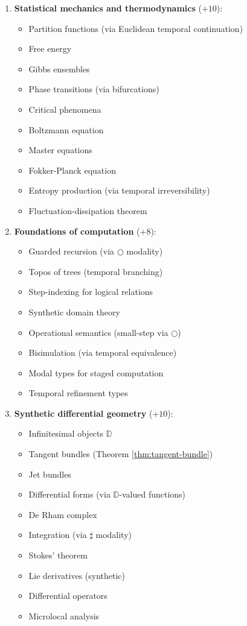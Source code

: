 \documentclass[11pt]{article}
\theoremstyle{definition}
\begin{document}
\begin{enumerate}[leftmargin=*]
\item \textbf{Statistical mechanics and thermodynamics} ($+10$):
\begin{itemize}
\item Partition functions (via Euclidean temporal continuation)
\item Free energy
\item Gibbs ensembles
\item Phase transitions (via bifurcations)
\item Critical phenomena
\item Boltzmann equation
\item Master equations
\item Fokker-Planck equation
\item Entropy production (via temporal irreversibility)
\item Fluctuation-dissipation theorem
\end{itemize}

\item \textbf{Foundations of computation} ($+8$):
\begin{itemize}
\item Guarded recursion (via $\bigcirc$ modality)
\item Topos of trees (temporal branching)
\item Step-indexing for logical relations
\item Synthetic domain theory
\item Operational semantics (small-step via $\bigcirc$)
\item Bisimulation (via temporal equivalence)
\item Modal types for staged computation
\item Temporal refinement types
\end{itemize}

\item \textbf{Synthetic differential geometry} ($+10$):
\begin{itemize}
\item Infinitesimal objects $\mathbb{D}$
\item Tangent bundles (Theorem \ref{thm:tangent-bundle})
\item Jet bundles
\item Differential forms (via $\mathbb{D}$-valued functions)
\item De Rham complex
\item Integration (via $\sharp$ modality)
\item Stokes' theorem
\item Lie derivatives (synthetic)
\item Differential operators
\item Microlocal analysis
\end{itemize}


\end{enumerate}
\end{document}
